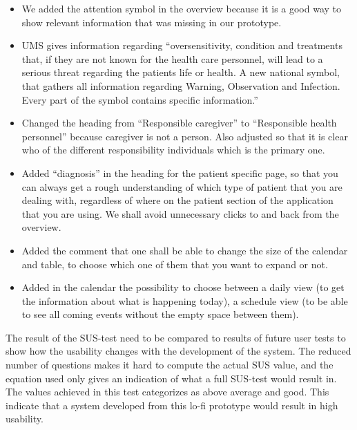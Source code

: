 \documentclass{article}
\begin{document}
\begin{itemize}
		\item We added the attention symbol in the overview because it is a good way to show relevant information that was missing in our prototype.
		
		\item UMS gives information regarding “oversensitivity, condition and treatments that, if they are not known for the health care personnel, will lead to a serious threat regarding the patients life or health. A new national symbol, that gathers all information regarding Warning, Observation and Infection. Every part of the symbol contains specific information.”
		
		\item Changed the heading from “Responsible caregiver” to “Responsible health personnel” because caregiver is not a person. Also adjusted so that it is clear who of the different responsibility individuals which is the primary one.
		
		\item Added “diagnosis” in the heading for the patient specific page, so that you can always get a rough understanding of which type of patient that you are dealing with, regardless of where on the patient section of the application that you are using. We shall avoid unnecessary clicks to and back from the overview.
		
		\item Added the comment that one shall be able to change the size of the calendar and table, to choose which one of them that you want to expand or not.
		
		\item Added in the calendar the possibility to choose between a daily view (to get the information about what is happening today), a schedule view (to be able to see all coming events without the empty space between them).
		
	\end{itemize}
	
	The result of the SUS-test need to be compared to results of future user tests to show how the usability changes with the development of the system. The reduced number of questions makes it hard to compute the actual SUS value, and the equation used only gives an indication of what a full SUS-test would result in. The values achieved in this test categorizes as above average and good. This indicate that a system developed from this lo-fi prototype would result in high usability. 
	
\end{document}
